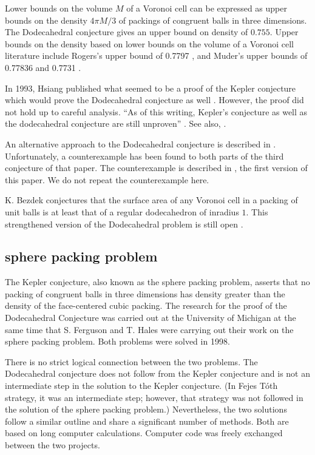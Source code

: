 Lower bounds on the volume $M$ of a Voronoi cell can be expressed
as upper bounds on the density $4\pi M/3$ of packings of congruent balls
in three dimensions. The Dodecahedral conjecture gives an upper
bound on density of $0.755$.  
Upper bounds on the density based on lower bounds on the volume of a Voronoi cell
literature include Rogers's upper bound of 0.7797 \cite{Rog}, and Muder's upper 
bounds of 0.77836 \cite{Muder1} and 0.7731 \cite{Muder2}. 

In 1993, Hsiang published what seemed to be a proof of the Kepler
conjecture which would prove the Dodecahedral conjecture 
as well \cite{Hsiang}.
However, the proof did not hold up to careful analysis.  ``As of this
writing, Kepler's conjecture as well as the dodecahedral conjecture
are still unproven'' \cite[p761]{Bezdek}.  See also, \cite{Hal94}.

An alternative approach to the Dodecahedral conjecture is described
in \cite{Bezdek}.  Unfortunately, a counterexample has been found to
both parts of the third conjecture of that paper.  The counterexample
is described in \cite{arx}, the first version of this paper.  We
do not repeat the counterexample here.


K. Bezdek conjectures that the surface area of any Voronoi cell in a packing
of unit balls is at least that of a regular dodecahedron of inradius $1$.
This strengthened version of the Dodecahedral problem is still
open \cite{Bez04}.   



\subsection{sphere packing problem}

The Kepler conjecture, also known as the sphere packing problem, 
asserts that no packing of congruent balls
in three dimensions has density greater than the density of the
face-centered cubic packing.  
The research for the proof of the Dodecahedral Conjecture 
was carried out at the University
of Michigan at the same time that S. Ferguson and T. Hales were
carrying out their work on the sphere packing problem.  Both
problems were solved in 1998.  

There is no strict logical connection between the two problems.
The Dodecahedral conjecture does not follow from the Kepler conjecture
and is not an intermediate step in the solution to the Kepler conjecture.
(In Fejes T\'oth strategy, it was an intermediate step; however, that
strategy was not followed in the solution of the sphere packing problem.)
Nevertheless,
the two solutions follow a similar outline and share a significant number of 
methods.
Both are based 
on long computer calculations.  Computer
code was freely exchanged between the two projects.

